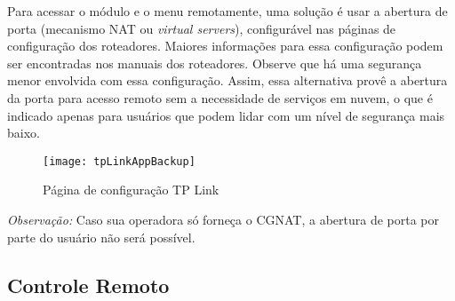 Para acessar o módulo e o menu remotamente, uma solução é usar a abertura de porta (mecanismo NAT ou \emph{virtual servers}), configurável nas páginas de configuração dos roteadores. Maiores informações para essa configuração podem ser encontradas nos manuais dos roteadores. Observe que há uma segurança menor envolvida com essa configuração. Assim, essa alternativa provê a abertura da porta para acesso remoto sem a necessidade de serviços em nuvem, o que é indicado apenas para usuários que podem lidar com um nível de segurança mais baixo.

\begin{figure}[H]
    \centering
    \caption{Página de configuração TP Link}
    \texttt{[image: tpLinkAppBackup]}
    \label{fig:tpLinkAppBackup}
\end{figure}

\emph{Observação:} Caso sua operadora só forneça o CGNAT, a abertura de porta por parte do usuário não será possível.

\subsection{Controle Remoto}

